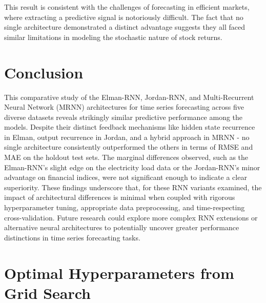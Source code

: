 \documentclass[conference, 10pt]{IEEEtran}
\begin{document}
This result is consistent with the challenges of forecasting in efficient markets, where extracting a predictive signal
is notoriously difficult. The fact that no single architecture demonstrated a distinct advantage suggests they all faced
similar limitations in modeling the stochastic nature of stock returns.


\section{Conclusion}

This comparative study of the Elman-RNN, Jordan-RNN, and Multi-Recurrent Neural Network (MRNN) architectures for time
series forecasting across five diverse datasets reveals strikingly similar predictive performance among the models.
Despite their distinct feedback mechanisms like hidden state recurrence in Elman, output recurrence in Jordan, and a hybrid
approach in MRNN - no single architecture consistently outperformed the others in terms of RMSE and MAE on the holdout
test sets. The marginal differences observed, such as the Elman-RNN's slight edge on the electricity load data or the
Jordan-RNN's minor advantage on financial indices, were not significant enough to indicate a clear superiority. These
findings underscore that, for these RNN variants examined, the impact of architectural differences is minimal
when coupled with rigorous hyperparameter tuning, appropriate data preprocessing, and time-respecting cross-validation.
Future research could explore more complex RNN extensions or alternative neural architectures to potentially uncover
greater performance distinctions in time series forecasting tasks.


\nocite{myrepo}


\appendix
\section{Optimal Hyperparameters from Grid Search}

\end{document}
